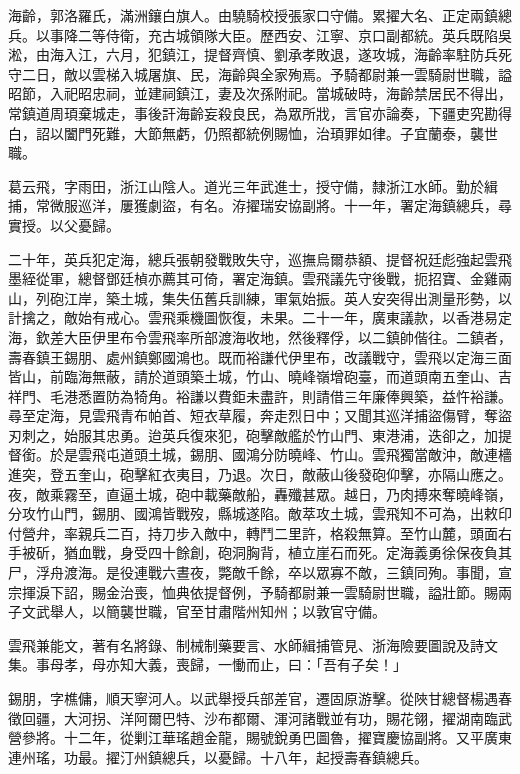 \begin{pinyinscope}
海齡，郭洛羅氏，滿洲鑲白旗人。由驍騎校授張家口守備。累擢大名、正定兩鎮總兵。以事降二等侍衛，充古城領隊大臣。歷西安、江寧、京口副都統。英兵既陷吳淞，由海入江，六月，犯鎮江，提督齊慎、劉承孝敗退，遂攻城，海齡率駐防兵死守二日，敵以雲梯入城屠旗、民，海齡與全家殉焉。予騎都尉兼一雲騎尉世職，謚昭節，入祀昭忠祠，並建祠鎮江，妻及次孫附祀。當城破時，海齡禁居民不得出，常鎮道周頊棄城走，事後訐海齡妄殺良民，為眾所戕，言官亦論奏，下疆吏究勘得白，詔以闔門死難，大節無虧，仍照都統例賜恤，治頊罪如律。子宜蘭泰，襲世職。

葛云飛，字雨田，浙江山陰人。道光三年武進士，授守備，隸浙江水師。勤於緝捕，常微服巡洋，屢獲劇盜，有名。洊擢瑞安協副將。十一年，署定海鎮總兵，尋實授。以父憂歸。

二十年，英兵犯定海，總兵張朝發戰敗失守，巡撫烏爾恭額、提督祝廷彪強起雲飛墨絰從軍，總督鄧廷楨亦薦其可倚，署定海鎮。雲飛議先守後戰，扼招寶、金雞兩山，列砲江岸，築土城，集失伍舊兵訓練，軍氣始振。英人安突得出測量形勢，以計擒之，敵始有戒心。雲飛乘機圖恢復，未果。二十一年，廣東議款，以香港易定海，欽差大臣伊里布令雲飛率所部渡海收地，然後釋俘，以二鎮帥偕往。二鎮者，壽春鎮王錫朋、處州鎮鄭國鴻也。既而裕謙代伊里布，改議戰守，雲飛以定海三面皆山，前臨海無蔽，請於道頭築土城，竹山、曉峰嶺增砲臺，而道頭南五奎山、吉祥門、毛港悉置防為犄角。裕謙以費鉅未盡許，則請借三年廉俸興築，益忤裕謙。尋至定海，見雲飛青布帕首、短衣草履，奔走烈日中；又聞其巡洋捕盜傷臂，奪盜刃刺之，始服其忠勇。迨英兵復來犯，砲擊敵艦於竹山門、東港浦，迭卻之，加提督銜。於是雲飛屯道頭土城，錫朋、國鴻分防曉峰、竹山。雲飛獨當敵沖，敵連檣進突，登五奎山，砲擊紅衣夷目，乃退。次日，敵蔽山後發砲仰擊，亦隔山應之。夜，敵乘霧至，直逼土城，砲中載藥敵船，轟殲甚眾。越日，乃肉搏來奪曉峰嶺，分攻竹山門，錫朋、國鴻皆戰歿，縣城遂陷。敵萃攻土城，雲飛知不可為，出敕印付營弁，率親兵二百，持刀步入敵中，轉鬥二里許，格殺無算。至竹山麓，頭面右手被斫，猶血戰，身受四十餘創，砲洞胸背，植立崖石而死。定海義勇徐保夜負其尸，浮舟渡海。是役連戰六晝夜，斃敵千餘，卒以眾寡不敵，三鎮同殉。事聞，宣宗揮淚下詔，賜金治喪，恤典依提督例，予騎都尉兼一雲騎尉世職，謚壯節。賜兩子文武舉人，以簡襲世職，官至甘肅階州知州；以敦官守備。

雲飛兼能文，著有名將錄、制械制藥要言、水師緝捕管見、浙海險要圖說及詩文集。事母孝，母亦知大義，喪歸，一慟而止，曰：「吾有子矣！」

錫朋，字樵傭，順天寧河人。以武舉授兵部差官，遷固原游擊。從陜甘總督楊遇春徵回疆，大河拐、洋阿爾巴特、沙布都爾、渾河諸戰並有功，賜花翎，擢湖南臨武營參將。十二年，從剿江華瑤趙金龍，賜號銳勇巴圖魯，擢寶慶協副將。又平廣東連州瑤，功最。擢汀州鎮總兵，以憂歸。十八年，起授壽春鎮總兵。


\end{pinyinscope}
